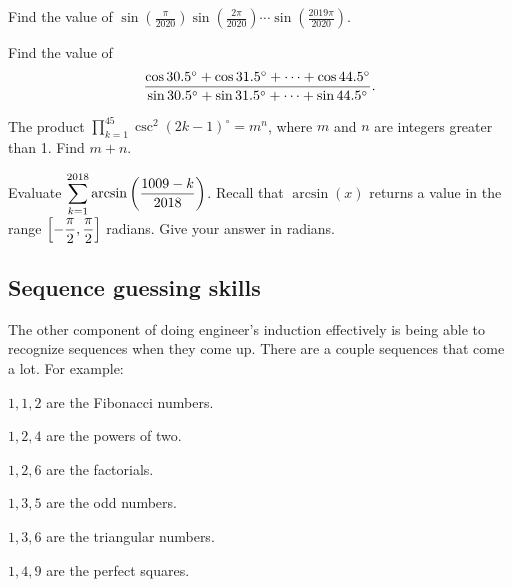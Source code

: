 \documentclass[11pt,paper=letter]{scrartcl}
\begin{document}
\begin{mdframed}[style=exmdbox]

\begin{problem}
Find the value of $\displaystyle \sin\left(\frac{\pi}{2020}\right)\sin\left(\frac{2\pi}{2020}\right)\cdots\sin\left(\frac{2019\pi}{2020}\right)$.
\end{problem}

\begin{problem}
Find the value of \[\dfrac{\cos 30.5^\circ + \cos 31.5^\circ + \cdots + \cos 44.5^\circ}{\sin 30.5^\circ + \sin 31.5^\circ + \cdots + \sin 44.5^\circ}.\]
\end{problem}

\begin{problem}[AIME I 2015/13]
The product $\displaystyle \prod_{k=1}^{45} \csc^2(2k-1)^\circ=m^n$, where $m$ and $n$ are integers greater than 1. Find $m+n$.
\end{problem}

\begin{problem}
Evaluate $\displaystyle \sum_{k=1}^{2018} \arcsin\left( \dfrac{1009-k}{2018} \right)$. Recall that $\arcsin(x)$ returns a value in the range $\left[ -\dfrac\pi2, \dfrac\pi2 \right]$ radians. Give your answer in radians.
\end{problem}


\end{mdframed}

\subsection{Sequence guessing skills}
\label{sec:sequenceguess}

The other component of doing engineer's induction effectively is being able to recognize sequences when they come up. There are a couple sequences that come a lot.  For example:

\begin{itemthin}
  \item $1, 1, 2$ are the Fibonacci numbers.
  \item $1, 2, 4$ are the powers of two.
  \item $1, 2, 6$ are the factorials.
  \item $1, 3, 5$ are the odd numbers.
  \item $1, 3, 6$ are the triangular numbers.
  \item $1, 4, 9$ are the perfect squares.
\end{itemthin}
\end{document}
